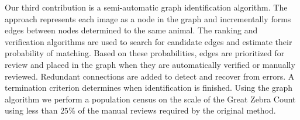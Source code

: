 \documentclass[chap]{thesis}
\begin{document}
Our third contribution is a semi-automatic graph identification algorithm.
The approach represents each image as a node in the graph and incrementally forms edges between nodes determined
  to the same animal.
The ranking and verification algorithms are used to search for candidate edges and estimate their probability of
  matching.
Based on these probabilities, edges are prioritized for review and placed in the graph when they are automatically
  verified or manually reviewed.
Redundant connections are added to detect and recover from errors.
A termination criterion determines when identification is finished.
Using the graph algorithm we perform a population census on the scale of the Great Zebra Count using less than
  $25\percent$ of the manual reviews required by the original method.


















%



\end{document}
